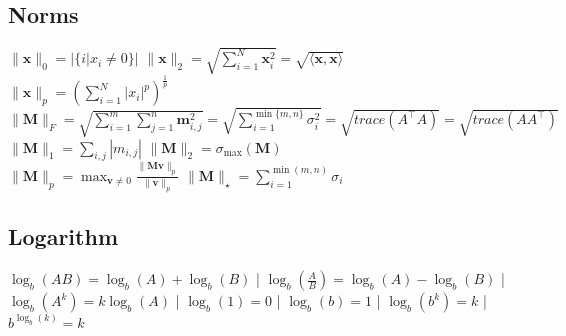 \subsection*{Norms}
$\|\mathbf{x}\|_0 = |\{i | x_i \neq 0\}|$ \qquad $\|\mathbf{x}\|_2 = \sqrt{\sum_{i=1}^{N} \mathbf{x}_i^2} = \sqrt{\langle \mathbf{x}, \mathbf{x} \rangle}$\\
$\|\mathbf{x}\|_p = \left( \sum_{i=1}^{N} |x_i|^p \right)^{\frac{1}{p}}$\\
$\|\mathbf{M}\|_F =\allowbreak \sqrt{\sum_{i=1}^{m} \sum_{j=1}^{n}\mathbf{m}_{i,j}^2} =\allowbreak \sqrt{\sum_{i=1}^{\min\{m, n\}} \sigma_i^2} = \sqrt{trace(A^\top A)} = \sqrt{trace(AA^\top)}$\\
$\|\mathbf{M}\|_1 = \sum_{i,j} | m_{i,j}|$ \qquad $\|\mathbf{M}\|_2 = \sigma_{\text{max}}(\mathbf{M})$\\
$\|\mathbf{M}\|_p = \max_{\mathbf{v} \neq 0} \frac{\|\mathbf{M}\mathbf{v}\|_p}{\|\mathbf{v}\|_p}$ \qquad $\|\mathbf{M}\|_\star = \sum_{i=1}^{\min(m, n)} \sigma_i$

\subsection*{Logarithm}
    $\log_b(AB) = \log_b(A) + \log_b(B)$ |
    $\log_b(\frac{A}{B}) = \log_b(A) - \log_b(B)$ |
    $\log_b(A^k) = k\log_b(A)$ |
    $\log_b(1) = 0$ |
    $\log_b(b) = 1$ |
    $\log_b(b^k) = k$ |
    $b^{\log_b(k)} = k$

